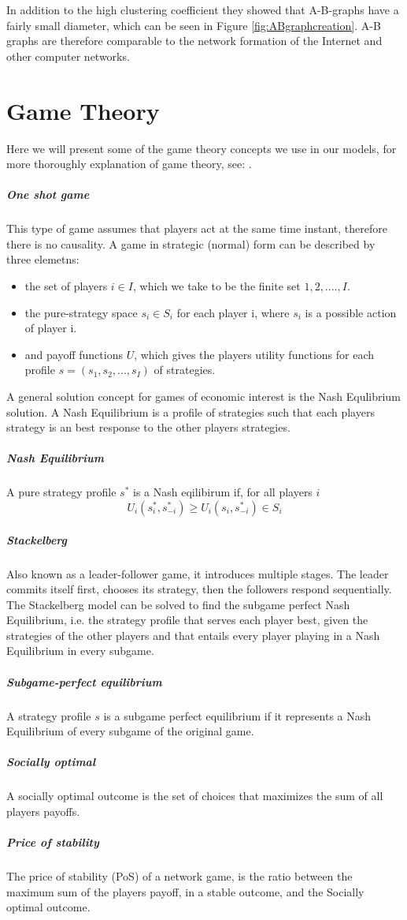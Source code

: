 In addition to the high clustering coefficient they showed that A-B-graphs have a fairly small diameter,
 which can be seen in Figure \ref{fig:ABgraphcreation}. 
 A-B graphs are therefore comparable to the network formation of the Internet and other computer networks. 






\section{Game Theory}
Here we will present some of the game theory concepts we use in our models, for more thoroughly explanation of game theory, see: \cite{nisan2007algorithmic, watson2008strategy}.
\subparagraph{One shot game}
This type of game assumes that players act at the same time instant, therefore there is no causality. A game in strategic (normal) form can be described by three elemetns:
\begin{itemize}
\item the set of players $i \in I$, which we take to be the finite set ${1,2,....,I}$.
\item the pure-strategy space $s_{i}\in S_{i}$ for each player i, where $s_{i}$ is a possible action of player i.
\item and payoff functions $U$, which gives the players utility functions for each profile $s=(s_{1},s_{2},...,s_{I})$ of strategies.
\end{itemize}
A general solution concept for games of economic interest is the Nash Equlibrium solution. A Nash Equilibrium is a profile of strategies such that each players strategy is an best response to the other players strategies. 
\subparagraph{Nash Equilibrium}
A pure strategy profile $s^{*}$ is a Nash eqilibirum if, for all players $i$
\begin{equation}
U_{i}(s^{*}_{i},s_{-i}^{*})\geq U_{i}(s_{i},s^{*}_{-i}) \in S_{i}
\end{equation}
\subparagraph{Stackelberg}
Also known as a leader-follower game, it introduces multiple stages. The leader commits itself first, chooses its strategy, then the followers respond sequentially. The Stackelberg model can be solved to find the subgame perfect Nash Equilibrium, i.e. the strategy profile that serves each player best, given the strategies of the other players and that entails every player playing in a Nash Equilibrium in every subgame.
\subparagraph{Subgame-perfect equilibrium}
A strategy profile $s$ is a subgame perfect equilibrium if it represents a Nash Equilibrium of every subgame of the original game.
\subparagraph{Socially optimal}
A socially optimal outcome is the set of choices that maximizes the sum of all players payoffs. 
\subparagraph{Price of stability}
The price of stability (PoS) of a network game, is the ratio between the maximum sum of the players payoff, in a stable outcome, and the Socially optimal outcome.

